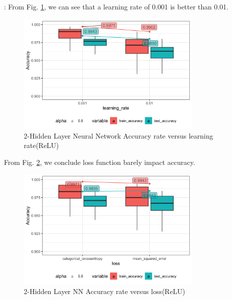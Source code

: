 \documentclass[8pt]{beamer}
\begin{document}
\begin{frame}[allowframebreaks]{\secname : \subsecname}
From Fig. \ref{2-Hidden Layer Neural Network Accuracy rate versus learning rate(ReLU)}, we can see that a learning rate of 0.001 is better than 0.01.
\begin{figure}[htbp]
\centerline{\includegraphics[width=0.8\textwidth]{figure/2-Hidden Layer Neural Network Accuracy rate versus learning_rate.png}}
\caption{2-Hidden Layer Neural Network Accuracy rate versus learning rate(ReLU)}
\label{2-Hidden Layer Neural Network Accuracy rate versus learning rate(ReLU)}
\end{figure}

From Fig. \ref{2-Hidden Layer Neural Network Accuracy rate versus loss(ReLU)}, we conclude loss function barely impact accuracy.
\begin{figure}[htbp]
\centerline{\includegraphics[width=0.8\textwidth]{figure/2-Hidden Layer Neural Network Accuracy rate versus loss.png}}
\caption{2-Hidden Layer NN Accuracy rate versus loss(ReLU)}
\label{2-Hidden Layer Neural Network Accuracy rate versus loss(ReLU)}
\end{figure}


\end{frame}
\end{document}
